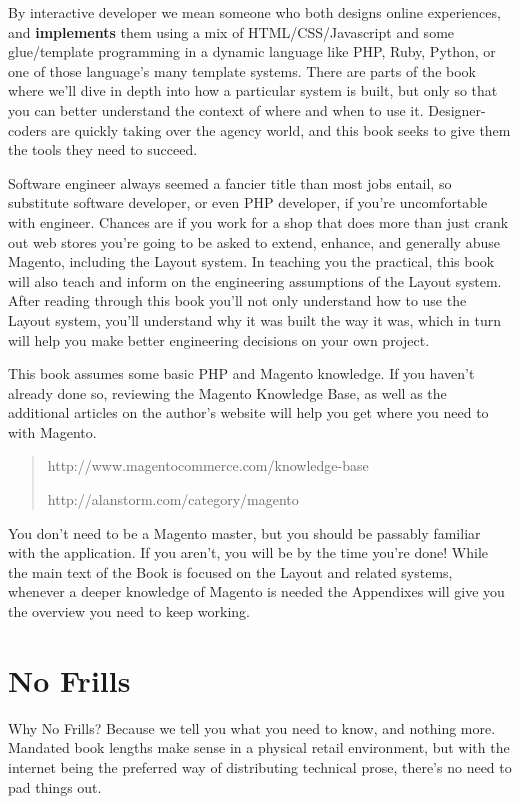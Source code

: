 \documentclass[oneside]{book}
\begin{document}
By interactive developer we mean someone who both designs online experiences, and \textbf{implements} them using a mix of HTML/CSS/Javascript and some glue/template programming in a dynamic language like PHP, Ruby, Python, or one of those language's many template systems.  There are parts of the book where we'll dive in depth into how a particular system is built, but only so that you can better understand the context of where and when to use it.  Designer-coders are quickly taking over the agency world, and this book seeks to give them the tools they need to succeed.

Software engineer always seemed a fancier title than most jobs entail, so substitute software developer, or even PHP developer, if you're uncomfortable with engineer.  Chances are if you work for a shop that does more than just crank out web stores you're going to be asked to extend, enhance, and generally abuse Magento, including the Layout system.  In teaching you the practical, this book will also teach and inform on the engineering assumptions of the Layout system.  After reading through this book you'll not only understand how to use the Layout system, you'll understand why it was built the way it was, which in turn will help you make better engineering decisions on your own project. 

This book assumes some basic PHP and Magento knowledge.  If you haven't already done so, reviewing the Magento Knowledge Base, as well as the additional articles on the author's website will help you get where you need to with Magento.

\begin{quote}
http://www.magentocommerce.com/knowledge-base 

  http://alanstorm.com/category/magento
\end{quote}

You don't need to be a Magento master, but you should be passably familiar with the application.  If you aren't, you will be by the time you're done!  While the main text of the Book is focused on the Layout and related systems, whenever a deeper knowledge of Magento is needed the Appendixes will give you the overview you  need to keep working. 

\section{No Frills}

Why No Frills?  Because we tell you what you need to know, and nothing more.  Mandated book lengths make sense in a physical retail environment, but with the internet being the preferred way of distributing technical prose, there's no need to pad things out.  
\end{document}

